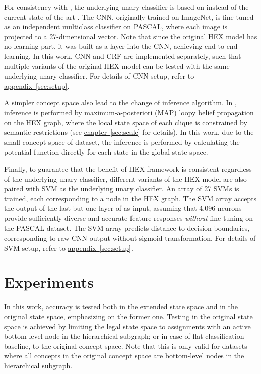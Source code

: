 \documentclass[11pt,a4paper]{book}
\begin{document}
For consistency with \cite{deng2014large}, the underlying unary classifier is based on \cite{krizhevsky2012imagenet} instead of the current state-of-the-art \cite{simonyan2014very, szegedy2014going}. The CNN, originally trained on ImageNet, is fine-tuned as an independent multiclass classifier on PASCAL, where each image is projected to a 27-dimensional vector. Note that since the original HEX model has no learning part, it was built as a layer into the CNN, achieving end-to-end learning. In this work, CNN and CRF are implemented separately, such that multiple variants of the original HEX model can be tested with the same underlying unary classifier. For details of CNN setup, refer to \hyperref[sec:setup]{appendix~\ref{sec:setup}}.

A simpler concept space also lead to the change of inference algorithm. In \cite{deng2014large}, inference is performed by maximum-a-posteriori (MAP) loopy belief propagation on the HEX graph, where the local state space of each clique is constrained by semantic restrictions (see \hyperref[sec:scale]{chapter~\ref{sec:scale}} for details). In this work, due to the small concept space of dataset, the inference is performed by calculating the potential function directly for each state in the global state space.

Finally, to guarantee that the benefit of HEX framework is consistent regardless of the underlying unary classifier, different variants of the HEX model are also paired with SVM as the underlying unary classifier. An array of 27 SVMs is trained, each corresponding to a node in the HEX graph. The SVM array accepts the output of the last-but-one layer of \cite{krizhevsky2012imagenet} as input, assuming that 4,096 neurons provide sufficiently diverse and accurate feature responses \emph{without} fine-tuning on the PASCAL dataset. The SVM array predicts distance to decision boundaries, corresponding to raw CNN output without sigmoid transformation. For details of SVM setup, refer to \hyperref[sec:setup]{appendix~\ref{sec:setup}}.

\section{Experiments}
\label{sec:exp1}

In this work, accuracy is tested both in the extended state space and in the original state space, emphasizing on the former one. Testing in the original state space is achieved by limiting the legal state space to assignments with an active bottom-level node in the hierarchical subgraph; or in case of flat classification baseline, to the original concept space. Note that this is only valid for datasets where all concepts in the original concept space are bottom-level nodes in the hierarchical subgraph.
\end{document}
